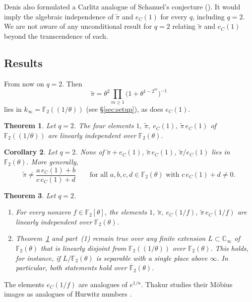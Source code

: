 \documentclass[11pt]{amsart}
\newtheorem{theorem}{Theorem}[section]
\newtheorem{corollary}[theorem]{Corollary}
\theoremstyle{remark}
\numberwithin{equation}{section}
\newcommand{\F}{\mathbb{F}}
\newcommand{\Cinf}{\mathbb{C}_\infty}
\newcommand{\kinf}{k_\infty}
\newcommand{\pit}{\tilde\pi}
\newcommand{\eC}{e_C}
\begin{document}
Denis also formulated a Carlitz analogue of Schanuel's conjecture (\cite[Conj.~2]{Pel17}). It would imply the algebraic independence of $\pit$ and $\eC(1)$ for every $q$, including $q=2$. We are not aware of any unconditional result for $q=2$ relating $\pit$ and $\eC(1)$ beyond the transcendence of each.

\subsection{Results}
From now on $q=2$. Then
\[
\pit=\theta^2\prod_{m\ge1}\bigl(1+\theta^{1-2^m}\bigr)^{-1}
\]
lies in $\kinf=\F_2((1/\theta))$ (see \S\ref{sec:setup}), as does $\eC(1)$.

\begin{theorem}\label{thm:main}
Let $q=2$. The four elements $1,\ \pit,\ \eC(1),\ \pit\,\eC(1)$ of $\F_2((1/\theta))$ are linearly independent over $\F_2(\theta)$.
\end{theorem}

\begin{corollary}\label{cor:mobius}
Let $q=2$. None of $\pit+\eC(1)$, $\pit\,\eC(1)$, $\pit/\eC(1)$ lies in $\F_2(\theta)$. More generally,
\[
\pit\neq\frac{a\,\eC(1)+b}{c\,\eC(1)+d}\qquad\text{for all } a,b,c,d\in\F_2(\theta) \text{ with } c\,\eC(1)+d\ne0 .
\]
\end{corollary}

\begin{theorem}\label{thm:ext}
Let $q=2$.
\begin{enumerate}
\item[(1)] For every nonzero $f\in\F_2[\theta]$, the elements $1,\ \pit,\ \eC(1/f),\ \pit\,\eC(1/f)$ are linearly independent over $\F_2(\theta)$.
\item[(2)] Theorem~\ref{thm:main} and part~(1) remain true over any finite extension $L\subset\Cinf$ of $\F_2(\theta)$ that is linearly disjoint from $\F_2((1/\theta))$ over $\F_2(\theta)$. This holds, for instance, if $L/\F_2(\theta)$ is separable with a single place above $\infty$. In particular, both statements hold over $\overline{\F}_2(\theta)$.
\end{enumerate}
\end{theorem}

The elements $\eC(1/f)$ are analogues of $e^{1/n}$. Thakur studies their M\"obius images as analogues of Hurwitz numbers \cite[\S3]{Tha11}.
\end{document}
